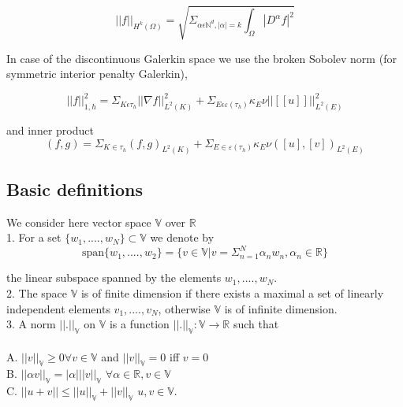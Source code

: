 \documentclass[a4paper,12pt]{book}
\begin{document}
\begin{equation}
||f||_{H^k (\Omega)} = \sqrt{\Sigma_{\alpha \epsilon \mathbb{N}^d, |\alpha| = k} \int_\Omega |D^\alpha f|^2}
\end{equation}

In case of the discontinuous Galerkin space we use the broken Sobolev norm (for symmetric interior penalty Galerkin), \cite{Montlaur2}

\begin{equation}
||f||_{1,h}^2 = \Sigma_{K \epsilon \tau_h} ||\nabla f||_{L^2(K)}^2 + \Sigma_{E \epsilon \varepsilon(\tau_h)} \kappa_E \nu ||[[u]]||_{L^2 (E)}^2
\end{equation}

and inner product \\

\begin{equation}
(f,g) = \Sigma_{K \in \tau_h} (f,g)_{L^2(K)} + \Sigma_{E \in \varepsilon(\tau_h)} \kappa_E \nu ([u],[v])_{L^2 (E)}
\end{equation}

\subsection{Basic definitions}\cite{crbm}

We consider here vector space $\mathbb{V}$ over $\mathbb{R}$\\

1. For a set $\lbrace w_1,....,w_N \rbrace \subset \mathbb{V}$ we denote by \\
\begin{equation} \label{vector space}
\mathrm{span} \lbrace w_1,....,w_2 \rbrace = \lbrace v \in \mathbb{V} | v = \Sigma_{n=1}^N \alpha_n w_n, \alpha_n \in \mathbb{R} \rbrace
\end{equation} 

the linear subspace spanned by the elements $w_1,....,w_N$.\\

2. The space $\mathbb{V}$ is of finite dimension if there exists a maximal a set of linearly independent elements $v_1,....,v_N$, otherwise $\mathbb{V}$ is of infinite dimension.\\

3. A norm $||.||_\mathbb{V}$ on $\mathbb{V}$ is a function $||.||_\mathbb{V} : \mathbb{V} \rightarrow \mathbb{R}$ such that\\ 
\\
A. $||v||_\mathbb{V} \geq 0 \forall v \in \mathbb{V}$ and $||v||_\mathbb{V} = 0$ iff $v=0$\\
B. $||\alpha v||_\mathbb{V} = |\alpha| ||v||_\mathbb{V}$  $\forall \alpha \in \mathbb{R}, v \in \mathbb{V}$\\
C. $||u+v|| \leq ||u||_\mathbb{V} + ||v||_\mathbb{V}$ $u,v \in \mathbb{V}$.\\
\end{document}
